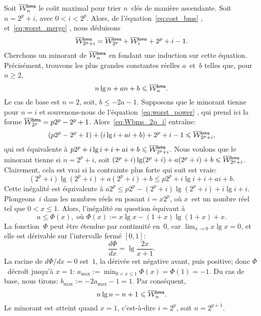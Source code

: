 
Soit \(\OW{\fun{bms}}{n}\) le coût
maximal pour trier \(n\)~clés de manière ascendante. Soit \(n=2^p+i\),
avec \(0 < i < 2^p\). Alors, de l'équation~\eqref{eq:cost_bms}
, et~\eqref{eq:worst_merge}
, nous déduisons
\begin{equation}
\OW{\fun{bms}}{2^p+i} = \OW{\fun{bms}}{2^p} + \OW{\fun{bms}}{i} + 2^p
+ i - 1.
\label{eq:Wbms_2p_i}
\end{equation}
Cherchons un minorant de \(\OW{\fun{bms}}{n}\) en fondant une
induction sur cette équation. Précisément, trouvons les plus grandes
constantes réelles \(a\)~et~\(b\) telles que, pour \(n \geqslant 2\),
\begin{equation*}
n\lg n + an + b \leqslant \OW{\fun{bms}}{n}.
\end{equation*}
Le cas de base est \(n=2\), soit, \(b \leqslant -2a - 1\). Supposons
que le minorant tienne pour \(n=i\) et souvenons-nous de
l'équation~\eqref{eq:worst_power} , qui prend
ici la forme \(\OW{\fun{bms}}{2^p} = p2^p - 2^p +
1\). Alors~\eqref{eq:Wbms_2p_i} entraîne:
\begin{equation*}
(p2^p - 2^p + 1) + (i\lg i + ai + b) + 2^p + i - 1 \leqslant
\OW{\fun{bms}}{2^p+i},
\end{equation*}
qui est équivalente à \(p2^p + i\lg i + i + ai + b \leqslant
\OW{\fun{bms}}{2^p+i}\). Nous voulons que le minorant tienne si
\(n=2^p+i\), soit \((2^p+i)\lg(2^p+i) + a(2^p+i) + b \leqslant
\OW{\fun{bms}}{2^p+i}\). Clairement, cela est vrai si la contrainte
plus forte qui suit est vraie:
\begin{equation*}
(2^p+i)\lg(2^p+i) + a(2^p+i) + b \leqslant p2^p + i\lg i + i + ai + b.
\end{equation*}
Cette inégalité est équivalente à \(a2^p \leqslant p2^p -
(2^p+i)\lg(2^p+i) + i\lg i + i\). Plongeons~\(i\) dans les nombres
réels en posant \(i=x2^p\), où \(x\)~est un nombre réel tel que \(0 <
x \leqslant 1\). Alors, l'inégalité en question équivaut à
\begin{equation*}
a \leqslant \Phi(x),\; \text{où \(\Phi(x) := x\lg x -
  (1+x)\lg(1+x) + x\).}
\end{equation*}
La fonction~\(\Phi\) peut être étendue par continuité en~\(0\), car
\(\lim_{x \to 0} x\lg x = 0\), et elle est dérivable sur l'intervalle
fermé \([0,1]\):
\begin{equation*}
\frac{d\Phi}{dx} = \lg\frac{2x}{x+1}.
\end{equation*}
La racine de \(d\Phi/dx = 0\) est~\(1\), la dérivée est négative
avant, puis positive; donc \(\Phi\)~décroît jusqu'à \(x=1\):
\(a_{\max} := \min_{0 < x \leqslant 1}\Phi(x) = \Phi(1) = -1\). Du cas
de base, nous tirons: \(b_{\max} := -2a_{\max} - 1 = 1\). Par
conséquent,
\begin{equation*}
n\lg n - n + 1 \leqslant \OW{\fun{bms}}{n}.
\end{equation*}
Le minorant est atteint quand \(x=1\), c'est-à-dire \(i=2^p\), soit
\(n=2^{p+1}\).

